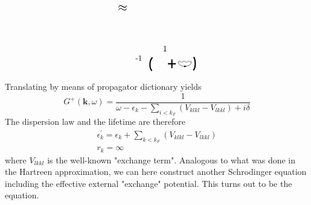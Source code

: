 \begin{equation}
\begin{tikzpicture}[x=0.55pt,y=0.55pt,yscale=-1,xscale=1]
\draw    (184.61,187.3) .. controls (186.28,185.63) and (187.94,185.63) .. (189.61,187.3) .. controls (191.28,188.97) and (192.94,188.97) .. (194.61,187.3) .. controls (196.28,185.63) and (197.94,185.63) .. (199.61,187.3) .. controls (201.28,188.97) and (202.94,188.97) .. (204.61,187.3) .. controls (206.28,185.63) and (207.94,185.63) .. (209.61,187.3) -- (212.88,187.3) -- (212.88,187.3) ;
\draw    (184.61,187.3) .. controls (184.29,200.82) and (212.88,200.82) .. (212.88,187.3) ;
\draw  [fill={rgb, 255:red, 0; green, 0; blue, 0 }  ,fill opacity=1 ] (201.7,197.17) -- (197.65,198.99) -- (197.56,195.9) -- cycle ;
\draw [line width=1.5]    (162.25,191.8) -- (179.25,191.8) ;
\draw [line width=1.5]    (170.75,201.4) -- (170.75,182.21) ;

\draw [line width=1.5]    (128.88,178) .. controls (121.88,185) and (121.88,202) .. (127.88,207) ;
\draw [line width=1.5]    (217.88,177) .. controls (222.88,186) and (221.88,201) .. (216.88,206) ;

\draw (52.62,63.17) node [anchor=north west][inner sep=0.75pt]  [font=\Large]  {$\approx $};
\draw (149.62,151.73) node [anchor=north west][inner sep=0.75pt]    {$1$};
\draw (90.62,172.73) node [anchor=north west][inner sep=0.75pt]  [font=\small] [align=left] {\mbox{-}1};


\end{tikzpicture}
\label{Hartree-fock-diagram-series}
\end{equation}
Translating by means of propagator dictionary yields
\begin{equation}G^{+}(\mathbf{k}, \omega)=\frac{1}{\omega-\epsilon_{k}-\sum_{i<k_{F}}\left(V_{k l k l}-V_{l k k l}\right)+i \delta}\end{equation}
The dispersion law and the lifetime are therefore
\begin{equation}\begin{array}{l}
\epsilon_{k}^{\prime}=\epsilon_{k}+\sum_{k<k_{F}}\left(V_{k l k l}-V_{l k k l}\right) \\
r_{k}=\infty
\end{array}\end{equation}
where $V_{lkkl}$ is the well-known "exchange term". Analogous to what was done in the Hartreen approximation, we can here construct another Schrodinger equation including the effective external "exchange" potential. This turns out to be the  equation. 

